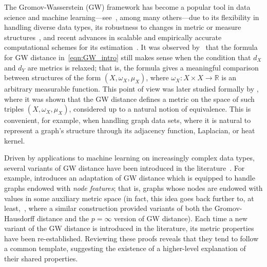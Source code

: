 \documentclass[twoside,11pt]{article}
\theoremstyle{definition}
\newcommand{\R}{\mathbb{R}}
\begin{document}
The Gromov-Wasserstein (GW) framework has become a popular tool in data science and machine learning---see~\citep{demetci2022scot,chowdhury2021generalized,
chapel2020partial,
xu2020gromov,
chowdhury2020gromov,
alvarez2018gromov}, among many others---due to its flexibility in handling diverse data types, its  robustness to changes in metric or measure structures~\citep[Theorem 5.1]{memoli2011}, and recent advances in scalable and empirically accurate computational schemes for its estimation~\citep{peyre2016gromov,xu2019scalable,chowdhury2021quantized,scetbon2022linear,li2023efficient,vedula2024scalable}. It was observed by~\citet{peyre2016gromov} that the formula for GW distance in~\eqref{eqn:GW_intro} still makes sense when the condition that $d_X$ and $d_Y$ are metrics is relaxed; that is, the formula gives a meaningful comparison between structures of the form $(X,\omega_X,\mu_X)$, where $\omega_X:X \times X \to \R$ is an arbitrary measurable function.  This point of view was later studied formally by \citet{chowdhury2019gromov}, where it was shown that the GW distance defines a metric on the space of such triples $(X,\omega_X,\mu_X)$, considered up to a natural notion of equivalence. This is convenient, for example, when handling graph data sets, where it is natural to represent a graph's structure through its adjacency function, Laplacian, or heat kernel. 


Driven by applications to machine learning on increasingly complex data types, several variants of GW distance have been introduced in the literature~\citep{memoli2009spectral,vayer2020fused,woojin-thesis,memoli2021ultrametric,arya2023gromov,yang2023exploiting}. For example, \citet{vayer2020fused} introduces an adaptation of GW distance which is equipped to handle graphs endowed with \emph{node features}; that is, graphs whose nodes are endowed with values in some auxiliary metric space (in fact, this idea goes back further to, at least,~\citealt[Section 5]{chazal2009gromov}, where a similar construction provided variants of both the Gromov-Hausdorff distance and the $p=\infty$ version of GW distance). Each time a new variant of the GW distance is introduced in the literature, its metric properties have been re-established. Reviewing these proofs reveals that they tend to follow a common template, suggesting the existence of a higher-level explanation of their shared properties. 
\end{document}
